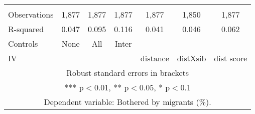 \begin{tabular}{lcccccc}
 &  &  &  &  &  &  \\
Observations & 1,877 & 1,877 & 1,877 & 1,877 & 1,850 & 1,877 \\
R-squared & 0.047 & 0.095 & 0.116 & 0.041 & 0.046 & 0.062 \\
Controls & None & All & Inter &  &  &  \\
 IV &  &  &  & distance & distXsib & dist score \\ \hline
\multicolumn{7}{c}{ Robust standard errors in brackets} \\
\multicolumn{7}{c}{ *** p$<$0.01, ** p$<$0.05, * p$<$0.1} \\
\multicolumn{7}{c}{ Dependent variable: Bothered by migrants (\%).} \\
\end{tabular}
